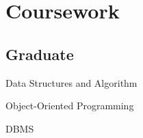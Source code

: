 \documentclass[]{azhagu-swe-resume-openfont}
\begin{document}
\begin{minipage}[t]{0.33\textwidth}
\section{Coursework}
\subsection{Graduate}
\begin{tightemize}
\item Data Structures and Algorithm
\item Object-Oriented Programming 
\item DBMS 
\end{tightemize}



\sectionsep


\end{minipage} 
\hfill
\end{document}
